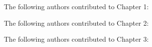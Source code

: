 \noindent The following authors contributed to Chapter 1:

\noindent The following authors contributed to Chapter 2:

\noindent The following authors contributed to Chapter 3:
